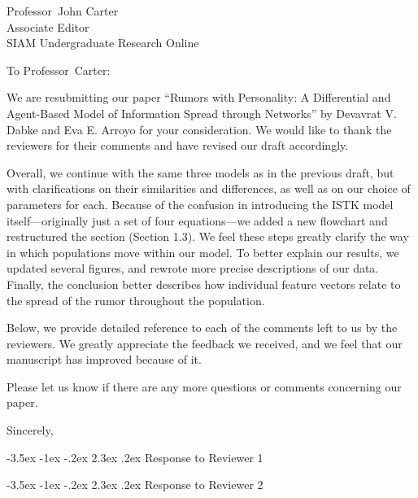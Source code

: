 \documentclass{letter}
\makeatletter
\newcounter{section}
\newcommand\section{\@startsection {section}{1}{\z@}%
                                   {-3.5ex \@plus -1ex \@minus -.2ex}%
                                   {2.3ex \@plus.2ex}%
                                   {\normalfont\Large\bfseries}}
\renewcommand{\closing}[1]{\par\nobreak\vspace{\parskip}%
  \stopbreaks
  \noindent
  \ifx\@empty\fromaddress\else
  \hspace*{\longindentation}\fi
  \parbox{\indentedwidth}{\raggedright
       \ignorespaces #1\\[2\medskipamount]%
       \ifx\@empty\fromsig
           \fromname
       \else \fromsig \fi\strut}%
   \par}
\makeatother
\begin{document}
\begin{letter}{Professor\ John Carter\\
Associate Editor\\
SIAM Undergraduate Research Online\\}
\opening{To Professor\ Carter:}

We are resubmitting our paper ``Rumors with Personality: A Differential and Agent-Based Model of Information Spread through Networks'' by Devavrat V. Dabke and Eva E. Arroyo for your consideration.
We would like to thank the reviewers for their comments and have revised our draft accordingly.

Overall, we continue with the same three models as in the previous draft, but with clarifications on their similarities and differences, as well as on our choice of parameters for each.
Because of the confusion in introducing the ISTK model itself---originally just a set of four equations---we added a new flowchart and restructured the section (Section 1.3).
We feel these steps greatly clarify the way in which populations move within our model.
To better explain our results, we updated several figures, and rewrote more precise descriptions of our data.
Finally, the conclusion better describes how individual feature vectors relate to the spread of the rumor throughout the population.

Below, we provide detailed reference to each of the comments left to us by the reviewers.
We greatly appreciate the feedback we received, and we feel that our manuscript has improved because of it.

Please let us know if there are any more questions or comments concerning our paper.

\vspace{12pt}
\closing{Sincerely,}

\section{Response to Reviewer 1}



\section{Response to Reviewer 2}










\end{letter}
\end{document}
